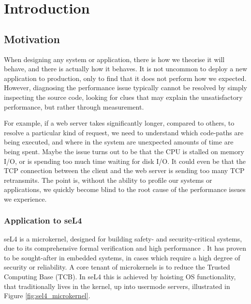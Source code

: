 \chapter{Introduction}\label{ch:intro}

\section{Motivation}

When designing any system or application, there is how we theorise it will behave, and there is actually how it behaves. It is not uncommon to deploy a new application to production, only to find that it does not perform how we expected. However, diagnosing the performance issue typically cannot be resolved by simply inspecting the source code, looking for clues that may explain the unsatisfactory performance, but rather through measurement.

For example, if a web server takes significantly longer, compared to others, to resolve a particular kind of request, we need to understand which code-paths are being executed, and where in the system are unexpected amounts of time are being spent. Maybe the issue turns out to be that the CPU is stalled on memory I/O, or is spending too much time waiting for disk I/O. It could even be that the TCP connection between the client and the web server is sending too many TCP retransmits. The point is, without the ability to profile our systems or applications, we quickly become blind to the root cause of the performance issues we experience.

\subsection{Application to seL4}

seL4 is a microkernel, designed for building safety- and security-critical systems, due to its comprehensive formal verification and high performance \cite{SiteAboutSeL4}. It has proven to be sought-after in embedded systems, in cases which require a high degree of security or reliability. A core tenant of microkernels is to reduce the Trusted Computing Base (TCB). In seL4 this is achieved by hoisting OS functionality, that traditionally lives in the kernel, up into usermode servers, illustrated in Figure \ref{fig:sel4_microkernel}.

